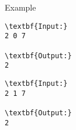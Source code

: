 Example
\begin{verbatim}
\textbf{Input:}
2 0 7

\textbf{Output:}
2\end{verbatim}
\begin{verbatim}
\textbf{Input:}
2 1 7

\textbf{Output:}
2\end{verbatim}